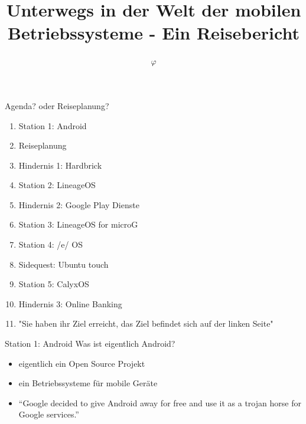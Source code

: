 \documentclass[14pt,compress,usenames,dvipsnames,aspectratio=169]{beamer}
\title{\textbf{Unterwegs in der Welt der mobilen Betriebssysteme - Ein Reisebericht}}
\author{\textbf{$\varphi$}}
\date{}
\begin{document}

\begin{frame}[plain]
\titlepage
{}
\end{frame}

\begin{frame}{Agenda? oder Reiseplanung?}
    \begin{enumerate}
        \item Station 1: Android
        \item Reiseplanung 
        \item Hindernis 1: Hardbrick
        \item Station 2: LineageOS
        \item Hindernis 2: Google Play Dienste
        \item Station 3: LineageOS for microG
        \item Station 4: /e/ OS 
        \item Sidequest: Ubuntu touch 
        \item Station 5: CalyxOS 
        \item Hindernis 3: Online Banking
        \item "Sie haben ihr Ziel erreicht, das Ziel befindet sich auf der linken Seite"
    \end{enumerate}


\end{frame}

\begin{frame}{Station 1: Android}
    Was ist eigentlich Android? 
    \begin{itemize}
        \item eigentlich ein Open Source Projekt
        \item ein Betriebssysteme für mobile Geräte
        \item “Google decided to give Android away for free and use it as a trojan horse for Google services.”
    \end{itemize}
    
   
\end{frame}
\end{document}
